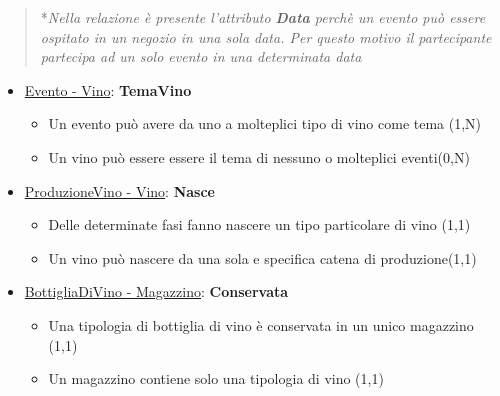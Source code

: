 \begin{verse}
	*\emph{Nella relazione è presente l'attributo \textbf{Data} perchè un evento può essere ospitato in un negozio in una sola data. Per questo motivo il partecipante partecipa ad un solo evento in una determinata data}
\end{verse}

\begin{itemize}
	\item \underline{Evento - Vino}: \textbf{TemaVino}
	
	\begin{itemize}
		\item Un evento può avere da uno a molteplici tipo di vino come tema (1,N)
		\item Un vino può essere essere il tema di nessuno o molteplici eventi(0,N)
	\end{itemize}
	
\end{itemize}

\begin{itemize}
	\item \underline{ProduzioneVino - Vino}: \textbf{Nasce}
	
	\begin{itemize}
		\item Delle determinate fasi fanno nascere un tipo particolare di vino (1,1)
		\item Un vino può nascere da una sola e specifica catena di produzione(1,1)
	\end{itemize}
	
\end{itemize}

\begin{itemize}
	\item \underline{BottigliaDiVino - Magazzino}: \textbf{Conservata}
	
	\begin{itemize}
		\item Una tipologia di bottiglia di vino è conservata in un unico magazzino (1,1)
		\item Un magazzino contiene solo una tipologia di vino (1,1)
	\end{itemize}
	
\end{itemize}
